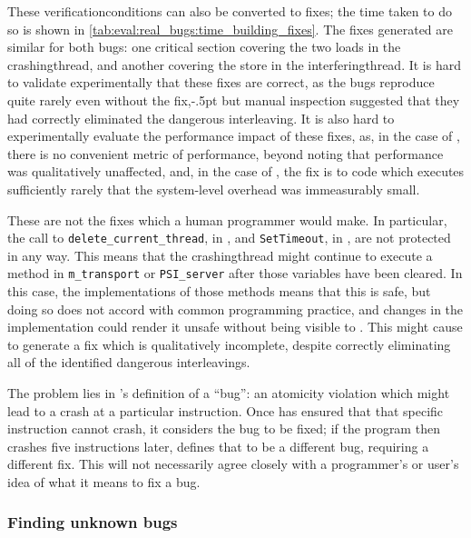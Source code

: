\noindent
These \glspl{verificationcondition} can also be converted to fixes;
the time taken to do so is shown in
\autoref{tab:eval:real_bugs:time_building_fixes}.  The fixes generated
are similar for both bugs: one critical section covering the two loads
in the \gls{crashingthread}, and another covering the store in the
\gls{interferingthread}.  It is hard to validate experimentally that
these fixes are correct, as the bugs reproduce quite rarely even
without the fix,\kern-.5pt but manual inspection
suggested that they had correctly eliminated the dangerous
interleaving.  It is also hard to experimentally evaluate the
performance impact of these fixes, as, in the case of
, there is no convenient metric of performance,
beyond noting that performance was qualitatively unaffected, and, in
the case of , the fix is to code which executes
sufficiently rarely that the system-level overhead was immeasurably
small.

These are not the fixes which a human programmer would make.  In
particular, the call to \texttt{delete\_current\_thread}, in
, and \texttt{SetTimeout}, in ,
are not protected in any way.  This means that the
\gls{crashingthread} might continue to execute a method in
\texttt{m\_transport} or \texttt{PSI\_server} after those variables
have been cleared.  In this case, the implementations of those methods
means that this is safe, but doing so does not accord with common
programming practice, and changes in the implementation could render
it unsafe without being visible to {\technique}.  This might cause
{\technique} to generate a fix which is qualitatively incomplete,
despite correctly eliminating all of the identified dangerous
interleavings.

The problem lies in {\technique}'s definition of a ``bug'': an
atomicity violation which might lead to a crash at a particular
instruction.  Once {\implementation} has ensured that that specific
instruction cannot crash, it considers the bug to be fixed; if the
program then crashes five instructions later, {\technique} defines
that to be a different bug, requiring a different fix.  This will not
necessarily agree closely with a programmer's or user's idea of what
it means to fix a bug.

\subsubsection{Finding unknown bugs}
\label{sect:how:finding_unknown}

